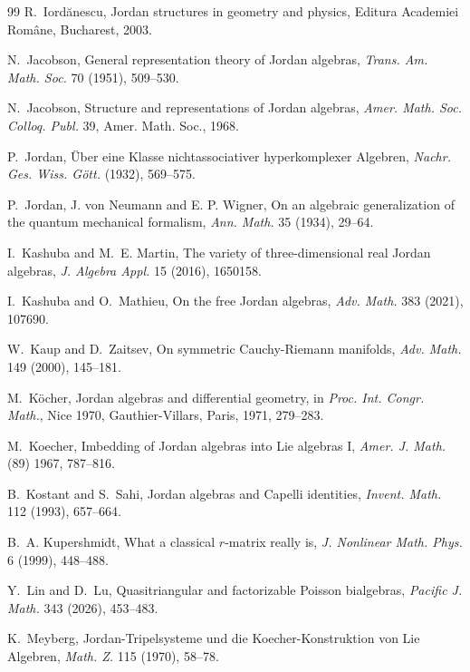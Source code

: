 \documentclass[12pt, reqno, a4paper]{amsart}
\theoremstyle{definition}
\begin{document}
\begin{thebibliography}{99}
	R.~Iord{\u{a}}nescu, Jordan structures in geometry and physics, Editura Academiei Rom{\^{a}}ne, Bucharest, 2003.

	N.~Jacobson, General representation theory of Jordan algebras, \textit{Trans. Am. Math. Soc.} 70 (1951), 509--530.

	N.~Jacobson, Structure and representations of Jordan algebras, {\it Amer. Math. Soc. Colloq. Publ.} 39, Amer. Math. Soc., 1968.
	
	P.~Jordan, {\"{U}}ber eine Klasse nichtassociativer hyperkomplexer Algebren, {\it Nachr. Ges. Wiss. G{\"{o}}tt.} (1932), 569--575.
	
	P.~Jordan, J. von Neumann and E. P. Wigner, On an algebraic generalization of the quantum mechanical formalism, {\it Ann. Math.} 35 (1934), 29--64.
	
	
	I.~Kashuba and M.~E. Martin, The variety of three-dimensional real Jordan algebras, {\it J. Algebra Appl.} 15 (2016), 1650158.
	
	I.~Kashuba and O.~Mathieu, On the free Jordan algebras, {\it Adv. Math.} 383 (2021), 107690.
	
	
	W.~Kaup and D.~Zaitsev, On symmetric Cauchy-Riemann manifolds, \textit{Adv. Math.} 149 (2000), 145--181.
	
	
	M.~K{\"o}cher, Jordan algebras and differential geometry, in \textit{Proc. Int. Congr. Math.}, Nice 1970, Gauthier-Villars, Paris, 1971, 279--283. 

	
	M.~Koecher, Imbedding of Jordan algebras into Lie algebras I, {\it Amer. J. Math.} (89) 1967, 787--816.
	

	B.~Kostant and S.~Sahi, Jordan algebras and Capelli identities, {\it Invent. Math.} 112 (1993), 657--664.
	
	B.~A. Kupershmidt, What a classical $r$-matrix really is, \textit{J. Nonlinear Math. Phys.} 6 (1999), 448--488.
	
	
	Y.~Lin and D.~Lu, Quasitriangular and factorizable Poisson bialgebras, \textit{Pacific J. Math.} 343 (2026), 453--483.
	
	
	K.~Meyberg, Jordan-Tripelsysteme und die Koecher-Konstruktion von Lie Algebren, \textit{Math. Z.} 115 (1970), 58--78.
	

\end{thebibliography}
\end{document}
